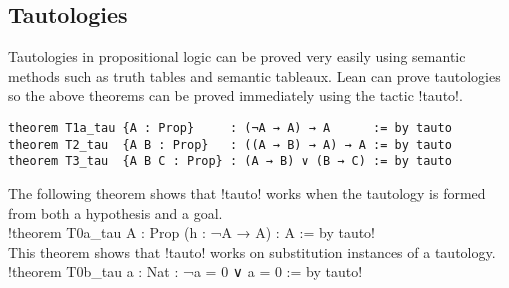 \newpage

\subsection{Tautologies}

Tautologies in propositional logic can be proved very easily using semantic methods such as truth tables and semantic tableaux. Lean can prove tautologies so the above theorems can be proved immediately using the tactic !tauto!.

\begin{Verbatim}[numbers=none]
theorem T1a_tau {A : Prop}     : (¬A → A) → A      := by tauto
theorem T2_tau  {A B : Prop}   : ((A → B) → A) → A := by tauto
theorem T3_tau  {A B C : Prop} : (A → B) ∨ (B → C) := by tauto
\end{Verbatim}
The following theorem shows that !tauto! works when the tautology is formed from both a hypothesis and a goal.\\
\indnt{}!theorem T0a_tau {A : Prop} (h : ¬A → A) : A := by tauto!\\

This theorem shows that !tauto! works on substitution instances of a tautology.\\
\indnt{}!theorem T0b_tau {a : Nat} : ¬a = 0 ∨ a = 0 := by tauto!
